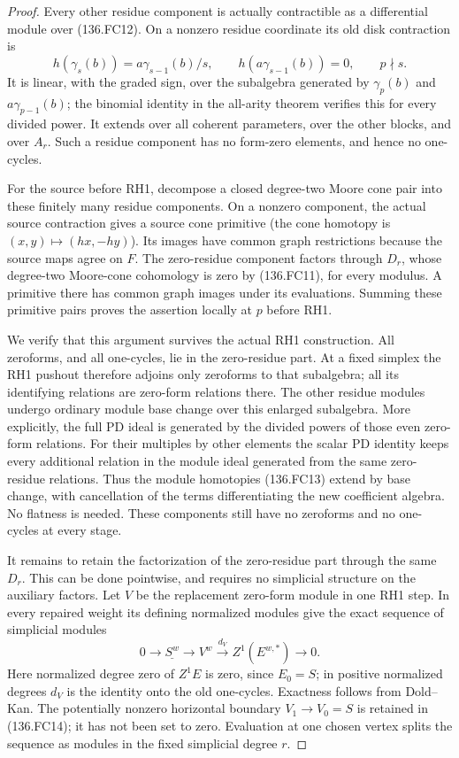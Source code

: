 \begin{proof}
Every other residue component is actually contractible as a
differential module over (136.FC12). On a nonzero residue
coordinate its old disk contraction is
\[
 h(\gamma_s(b))=a\gamma_{s-1}(b)/s,\qquad
 h(a\gamma_{s-1}(b))=0,\qquad p\nmid s.                  \tag{136.FC13}
\]
It is linear, with the graded sign, over the subalgebra generated
by \(\gamma_p(b)\) and \(a\gamma_{p-1}(b)\); the
binomial identity in the all-arity theorem verifies this for
every divided power. It extends over all coherent parameters,
over the other blocks, and over \(A_r\). Such a residue
component has no form-zero elements, and hence no one-cycles.

For the source before RH1, decompose a closed degree-two Moore
cone pair into these finitely many residue components. On a
nonzero component, the actual source contraction gives a source
cone primitive (the cone homotopy is \((x,y)\mapsto(hx,-hy)\)).
Its images have common graph restrictions because the source
maps agree on \(F\). The zero-residue component factors
through \(D_r\), whose degree-two Moore-cone cohomology is
zero by (136.FC11), for every modulus. A primitive there has
common graph images under its evaluations. Summing these primitive
pairs proves the assertion locally at \(p\) before RH1.

We verify that this argument survives the actual RH1 construction.
All zeroforms, and all one-cycles, lie in the zero-residue part.
At a fixed simplex the RH1 pushout therefore adjoins only zeroforms
to that subalgebra; all its identifying relations are zero-form
relations there. The other residue modules undergo ordinary module
base change over this enlarged subalgebra. More explicitly, the
full PD ideal is generated by the divided powers of those even
zero-form relations. For their multiples by other elements the
scalar PD identity keeps every additional relation in the module
ideal generated from the same zero-residue relations. Thus the
module homotopies (136.FC13) extend by base change, with cancellation
of the terms differentiating the new coefficient algebra. No
flatness is needed. These components still have no zeroforms and
no one-cycles at every stage.

It remains to retain the factorization of the zero-residue part
through the same \(D_r\). This can be done pointwise, and
requires no simplicial structure on the auxiliary factors.
Let \(V\) be the replacement zero-form module in one RH1
step. In every repaired weight its defining normalized modules
give the exact sequence of simplicial modules
\[
                 0\longrightarrow\underline{S^w}
                   \longrightarrow V^w\xrightarrow{d_V}Z^1(E^{w,*})
                   \longrightarrow0.                    \tag{136.FC14}
\]
Here normalized degree zero of \(Z^1E\) is zero, since
\(E_0=S\); in positive normalized degrees \(d_V\) is
the identity onto the old one-cycles. Exactness follows from
Dold--Kan. The potentially nonzero horizontal boundary
\(V_1\to V_0=S\) is retained in (136.FC14); it has not
been set to zero. Evaluation at one chosen vertex splits the
sequence as modules in the fixed simplicial degree \(r\).


\end{proof}

